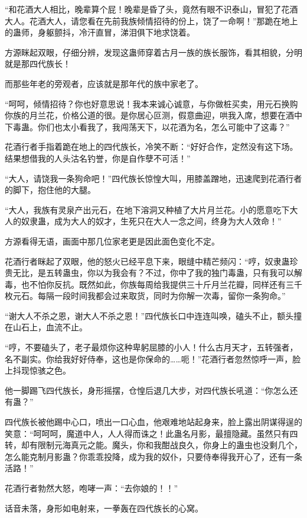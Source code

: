 \begin{this_body}
“和花酒大人相比，晚辈算个屁！晚辈是昏了头，竟然有眼不识泰山，冒犯了花酒大人。花酒大人，请您看在先前我族倾情招待的份上，饶了一命啊！”那跪在地上的蛊师，身躯颤抖，冷汗直冒，涕泪俱下地求饶着。

方源眯起双眼，仔细分辨，发现这蛊师穿着古月一族的族长服饰，看其相貌，分明就是那四代族长！

而那些年老的旁观者，应该就是那年代的族中家老了。

“呵呵，倾情招待？你也好意思说！我本来诚心诚意，与你做桩买卖，用元石换购你族的月兰花，价格公道的很。是你居心叵测，假意曲迎，哄我入席，想要在酒中下毒蛊。你们也太小看我了，我闯荡天下，以花酒为名，怎么可能中了这毒？”

花酒行者手指着跪在地上的四代族长，冷笑不断：“好好合作，定然没有这下场。结果想借我的人头沽名钓誉，你是自作孽不可活！”

“大人，请饶我一条狗命吧！”四代族长惊惶大叫，用膝盖蹭地，迅速爬到花酒行者的脚下，抱住他的大腿。

“大人，我族有灵泉产出元石，在地下溶洞又种植了大片月兰花。小的愿意吃下大人的奴隶蛊，成为大人的奴才，生死只在大人一念之间，终身为大人效命！”

方源看得无语，画面中那几位家老更是因此面色变化不定。

花酒行者眯起了双眼，他的怒火已经平息下来，眼缝中精芒频闪：“哼，奴隶蛊珍贵无比，是五转蛊虫，你以为我会有？不过，你中了我的独门毒蛊，只有我可以解毒，也不怕你反抗。既然如此，你族每周给我提供三十斤月兰花瓣，同样还有三千枚元石。每隔一段时间我都会过来取货，同时为你解一次毒，留你一条狗命。”

“谢大人不杀之恩，谢大人不杀之恩！”四代族长口中连连叫唤，磕头不止，额头撞在山石上，血流不止。

“哼，不要磕头了，老子最烦你这种卑躬屈膝的小人！什么古月天才，五转强者，名不副实。你给我好好侍奉，这也是你保命的……呃！”花酒行者忽然惊呼一声，脸上抖现惊骇之色。

他一脚踢飞四代族长，身形摇摆，仓惶后退几大步，对四代族长吼道：“你怎么还有蛊？”

四代族长被他踢中心口，喷出一口心血，他艰难地站起身来，脸上露出阴谋得逞的笑意：“呵呵呵，魔道中人，人人得而诛之！此蛊名月影，最擅隐藏。虽然只有四转，却有限制元海真元之能。魔头，你和我酣战良久，你身上的蛊虫也没剩几个，怎么能克制月影蛊？你乖乖投降，成为我的奴仆，只要侍奉得我开心了，还有一条活路！”

花酒行者勃然大怒，咆哮一声：“去你娘的！！”

话音未落，身形如电射来，一拳轰在四代族长的心窝。


\end{this_body}
